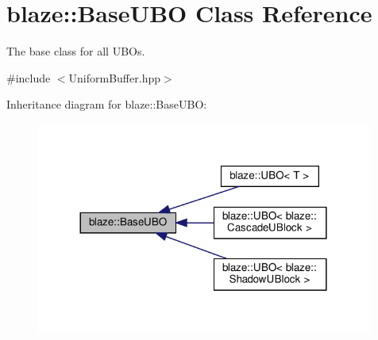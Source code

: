 \hypertarget{classblaze_1_1BaseUBO}{}\section{blaze\+:\+:Base\+U\+BO Class Reference}
\label{classblaze_1_1BaseUBO}


The base class for all U\+B\+Os.  




{\ttfamily \#include $<$Uniform\+Buffer.\+hpp$>$}



Inheritance diagram for blaze\+:\+:Base\+U\+BO\+:\nopagebreak
\begin{figure}[H]
\begin{center}
\leavevmode
\includegraphics[width=312pt]{classblaze_1_1BaseUBO__inherit__graph}
\end{center}
\end{figure}
